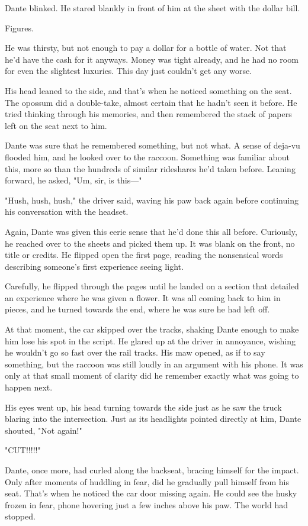Dante blinked. He stared blankly in front of him at the sheet with the dollar bill.

Figures.

He was thirsty, but not enough to pay a dollar for a bottle of water. Not that he'd have the cash for it anyways. Money was tight already, and he had no room for even the slightest luxuries. This day just couldn't get any worse.

His head leaned to the side, and that's when he noticed something on the seat. The opossum did a double-take, almost certain that he hadn't seen it before. He tried thinking through his memories, and then remembered the stack of papers left on the seat next to him.

Dante was sure that he remembered something, but not what. A sense of deja-vu flooded him, and he looked over to the raccoon. Something was familiar about this, more so than the hundreds of similar rideshares he'd taken before. Leaning forward, he asked, "Um, sir, is this---"

"Hush, hush, hush," the driver said, waving his paw back again before continuing his conversation with the headset.

Again, Dante was given this eerie sense that he'd done this all before. Curiously, he reached over to the sheets and picked them up. It was blank on the front, no title or credits. He flipped open the first page, reading the nonsensical words describing someone's first experience seeing light.

Carefully, he flipped through the pages until he landed on a section that detailed an experience where he was given a flower. It was all coming back to him in pieces, and he turned towards the end, where he was sure he had left off.

At that moment, the car skipped over the tracks, shaking Dante enough to make him lose his spot in the script. He glared up at the driver in annoyance, wishing he wouldn't go so fast over the rail tracks. His maw opened, as if to say something, but the raccoon was still loudly in an argument with his phone. It was only at that small moment of clarity did he remember exactly what was going to happen next.

His eyes went up, his head turning towards the side just as he saw the truck blaring into the intersection. Just as its headlights pointed directly at him, Dante shouted, "Not again!"

"CUT!!!!!"

Dante, once more, had curled along the backseat, bracing himself for the impact. Only after moments of huddling in fear, did he gradually pull himself from his seat. That's when he noticed the car door missing again. He could see the husky frozen in fear, phone hovering just a few inches above his paw. The world had stopped.

